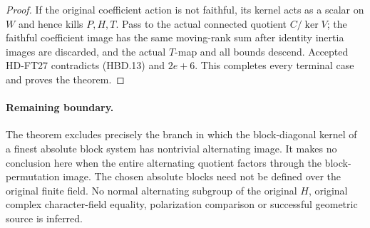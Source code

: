 \begin{proof}
If the original coefficient action is not faithful, its kernel
acts as a scalar on $W$ and hence kills $P,H,T$.  Pass to the
actual connected quotient $C/\ker V$; the faithful coefficient
image has the same moving-rank sum after identity inertia images
are discarded, and the actual $T$-map and all bounds descend.
Accepted HD-FT27 contradicts (HBD.13) and $2e+6$.
This completes every terminal case and proves the theorem.
\end{proof}

\paragraph{Remaining boundary.}
The theorem excludes precisely the branch in which the block-diagonal
kernel of a finest absolute block system has nontrivial alternating
image.  It makes no conclusion here when the entire alternating
quotient factors through the block-permutation image.  The chosen
absolute blocks need not be defined over the original finite field.
No normal alternating subgroup of the original $H$, original
complex character-field equality, polarization comparison or
successful geometric source is inferred.
